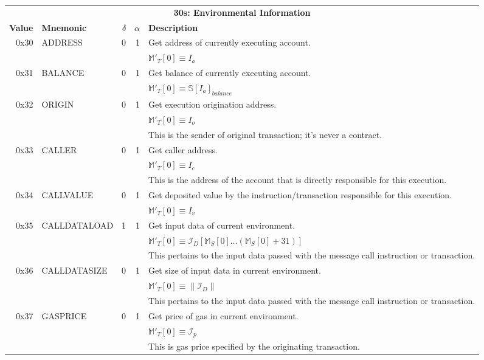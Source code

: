 \documentclass[9pt,oneside]{amsart}
\begin{document}
\begin{tabular*}{\columnwidth}[h]{rlrrl}
\toprule
\multicolumn{5}{c}{\textbf{30s: Environmental Information}} \vspace{5pt} \\
\textbf{Value} & \textbf{Mnemonic} & $\delta$ & $\alpha$ & \textbf{Description} \vspace{5pt} \\
0x30 & {\small ADDRESS} & 0 & 1 & Get address of currently executing account. \\
&&&& $\mathbb{M}'_T[0] \equiv I_a$ \\
\midrule
0x31 & {\small BALANCE} & 0 & 1 & Get balance of currently executing account. \\
&&&& $\mathbb{M}'_T[0] \equiv \mathbb{S}[I_a]_{balance}$ \\
\midrule
0x32 & {\small ORIGIN} & 0 & 1 & Get execution origination address. \\
&&&& $\mathbb{M}'_T[0] \equiv I_o$ \\
&&&& This is the sender of original transaction; it's never a contract. \\
\midrule
0x33 & {\small CALLER} & 0 & 1 & Get caller address. \\
&&&& $\mathbb{M}'_T[0] \equiv I_c$ \\
&&&& This is the address of the account that is directly responsible for this execution. \\
\midrule
0x34 & {\small CALLVALUE} & 0 & 1 & Get deposited value by the instruction/transaction responsible for this execution. \\
&&&& $\mathbb{M}'_T[0] \equiv I_v$ \\
\midrule
0x35 & {\small CALLDATALOAD} & 1 & 1 & Get input data of current environment. \\
&&&& $\mathbb{M}'_T[0] \equiv \mathcal{I}_D[ \mathbb{M}_S[0] \dots (\mathbb{M}_S[0] + 31) ]$ \\
&&&& This pertains to the input data passed with the message call instruction or transaction. \\
\midrule
0x36 & {\small CALLDATASIZE} & 0 & 1 & Get size of input data in current environment. \\
&&&& $\mathbb{M}'_T[0] \equiv \lVert \mathcal{I}_D \rVert$ \\
&&&& This pertains to the input data passed with the message call instruction or transaction. \\
\midrule
0x37 & {\small GASPRICE} & 0 & 1 & Get price of gas in current environment. \\
&&&& $\mathbb{M}'_T[0] \equiv \mathcal{I}_p$ \\
&&&& This is gas price specified by the originating transaction.\\
\bottomrule
\end{tabular*}
\end{document}
